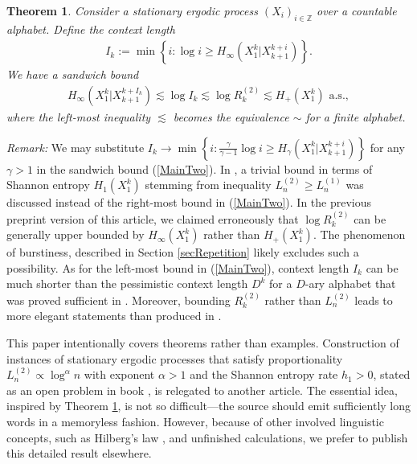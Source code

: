 \documentclass[a4paper,12pt]{article}
\newcommand{\klam}[1]{\left\{ #1 \right\}}
\newtheorem{theorem}{Theorem}
\begin{document}
\begin{theorem}
  \label{theoMainTwo}
  Consider a stationary ergodic process $(X_i)_{i\in\mathbb{Z}}$ over
  a countable alphabet. Define the context length
  \begin{align}
    \label{ContextLength}
    I_k:=\min\klam{i:\log i\ge H_\infty(X_1^k|X_{k+1}^{k+i})}.
  \end{align}
  We have a sandwich bound 
  \begin{align}
    \label{MainTwo}
    H_\infty(X_1^k|X_{k+1}^{k+I_k})\lesssim
    \log I_k\lesssim
    \log R^{(2)}_k\lesssim
    H_+(X_1^k)
    \text{ a.s.}
    ,
  \end{align}
  where the left-most inequality $\lesssim$ becomes the equivalence
  $\sim$ for a finite alphabet.
\end{theorem}
\emph{Remark:} We may substitute
$I_k\to\min\klam{i:\frac{\gamma}{\gamma-1}\log i\ge
  H_\gamma(X_1^k|X_{k+1}^{k+i})}$ for any $\gamma>1$ in the sandwich
bound (\ref{MainTwo}).  In \citep{Debowski18b,Debowski21}, a trivial
bound in terms of Shannon entropy $H_1(X_1^k)$ stemming from
inequality $L^{(2)}_n\ge L^{(1)}_n$ was discussed instead of the
right-most bound in (\ref{MainTwo}). In the previous preprint version
of this article, we claimed erroneously that $\log R^{(2)}_k$ can be
generally upper bounded by $H_\infty(X_1^k)$ rather than
$H_+(X_1^k)$. The phenomenon of burstiness, described in Section
\ref{secRepetition} likely excludes such a possibility.
As for the left-most bound in (\ref{MainTwo}), context length $I_k$
can be much shorter than the pessimistic context length $D^k$ for a
$D$-ary alphabet that was proved sufficient in \citep[Theorem
8]{Debowski18b}. Moreover, bounding $R^{(2)}_k$ rather than
$L^{(2)}_n$ leads to more elegant statements than produced in
\citep{Debowski18b,Debowski21}.

This paper intentionally covers theorems rather than examples.
Construction of instances of stationary ergodic processes that satisfy
proportionality $L^{(2)}_n\propto \log^\alpha n$ with exponent
$\alpha>1$ and the Shannon entropy rate $h_1>0$, stated as an open
problem in book \citep{Debowski21}, is relegated to another
article. The essential idea, inspired by Theorem \ref{theoMainTwo}, is
not so difficult---the source should emit sufficiently long words in a
memoryless fashion. However, because of other involved linguistic
concepts, such as Hilberg's law \citep{Hilberg90, TakahiraOthers16,
  KaplanOther20, Debowski21}, and unfinished calculations, we prefer
to publish this detailed result elsewhere.
\end{document}
